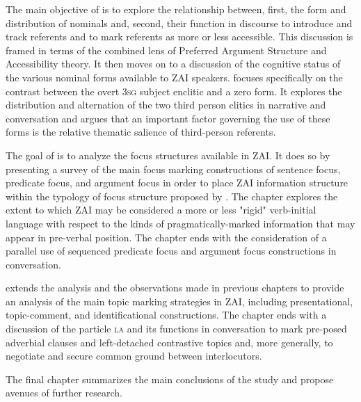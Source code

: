 The main objective of  is to explore the relationship between, first, the form and distribution of nominals and, second, their function in discourse to introduce and track referents and to mark referents as more or less accessible.  This discussion is framed in terms of the combined lens of Preferred Argument Structure and Accessibility theory. It then moves on to a discussion of the cognitive status of the various nominal forms available to ZAI speakers.  focuses specifically on the contrast between the overt \textsc{3sg} subject enclitic and a zero form. It explores the distribution and alternation of the two third person clitics in narrative and conversation and argues that an important factor governing the use of these forms is the relative thematic salience of third-person referents.  

The goal of  is to analyze the focus structures available in ZAI. It does so by presenting a survey of the main focus marking constructions of sentence focus, predicate focus, and argument focus \citep{lambrecht1994} in order to place ZAI information structure within the typology of focus structure proposed by \citet{vanvalin1999}. The chapter explores the extent to which ZAI may be considered a more or less "rigid" verb-initial language with respect to the kinds of pragmatically-marked information that may appear in pre-verbal position. The chapter ends with the consideration of a parallel use of sequenced predicate focus and argument focus constructions in conversation. 

 extends the analysis and the observations made in previous chapters to provide an analysis of the main topic marking strategies in ZAI, including presentational, topic-comment, and identificational constructions. The chapter ends with a discussion of the particle \textsc{la} and its functions in conversation to mark pre-posed adverbial clauses and left-detached contrastive topics and, more generally, to negotiate and secure common ground between interlocutors. 


The final chapter summarizes the main conclusions of the study and propose avenues of further research.





